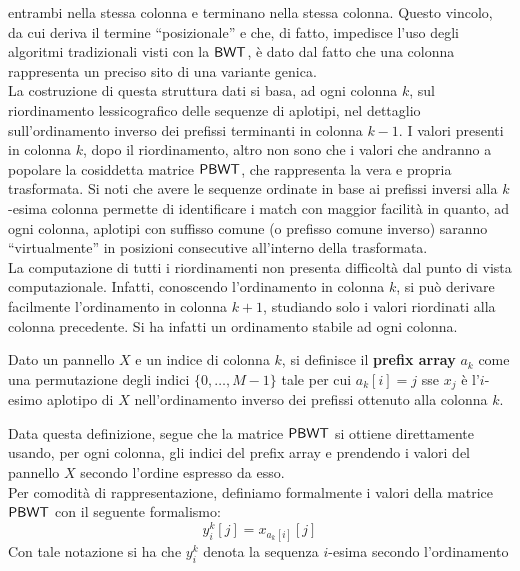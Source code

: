 entrambi nella stessa colonna e terminano nella stessa colonna. Questo vincolo,
da cui deriva il termine ``posizionale'' e che, di fatto, impedisce l'uso degli
algoritmi tradizionali visti con la $\mbox{\rm {\sf BWT}}$, è dato dal fatto che una
colonna rappresenta un preciso sito di una variante genica. \\
La costruzione di questa struttura dati si basa, ad ogni colonna $k$, sul
riordinamento lessicografico delle sequenze di aplotipi, nel dettaglio
sull'ordinamento 
inverso dei prefissi terminanti in colonna $k-1$. I valori presenti in colonna
$k$, dopo il riordinamento, altro non sono che i valori che andranno a popolare
la cosiddetta matrice $\mbox{\rm {\sf PBWT}}$, che rappresenta la vera e propria
trasformata. Si noti che avere le sequenze 
ordinate in base ai prefissi inversi alla $k$-esima colonna permette di
identificare i match con maggior facilità in quanto, ad ogni colonna, aplotipi
con suffisso comune (o prefisso comune inverso) saranno ``virtualmente'' in
posizioni 
consecutive all'interno della trasformata.\\
La computazione di tutti i riordinamenti non presenta difficoltà dal punto di
vista computazionale. Infatti, conoscendo l'ordinamento in colonna $k$, si può
derivare facilmente l'ordinamento in colonna $k+1$, studiando solo i valori
riordinati alla colonna precedente. Si ha infatti un ordinamento stabile ad ogni
colonna. 
\begin{definizione}
  Dato un pannello $X$ e un indice di colonna
  $k$, si definisce il \textbf{prefix array} $a_k$ come una permutazione degli
  indici $\{0,\ldots, M-1\}$ tale per cui $a_k[i]=j$ sse $x_j$ è l'$i$-esimo
  aplotipo di 
  $X$ nell'ordinamento inverso dei prefissi ottenuto alla colonna $k$.
\end{definizione}
Data questa definizione, segue che la matrice $\mbox{\rm {\sf PBWT}}$ si ottiene
direttamente usando, per ogni colonna, gli indici del prefix
  array e prendendo i valori del pannello $X$ secondo l'ordine espresso da
esso.\\ 
Per comodità di rappresentazione, definiamo formalmente i valori della
matrice $\mbox{\rm {\sf PBWT}}$ con il seguente formalismo:
\begin{equation}
  \label{eq:pbwty}
  y_i^k[j]=x_{a_k[i]}[j]
\end{equation}
Con tale notazione si ha che $y_i^k$ denota la sequenza $i$-esima secondo
l'ordinamento 
